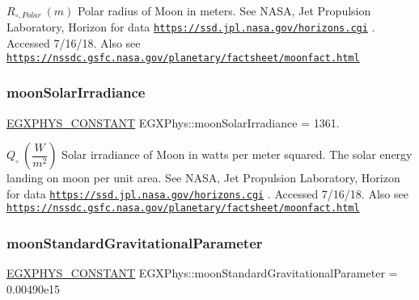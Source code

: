 $R_{\circ,Polar} \ (m)$ Polar radius of Moon in meters. See N\+A\+SA, Jet Propulsion Laboratory, Horizon for data \href{https://ssd.jpl.nasa.gov/horizons.cgi}{\tt https\+://ssd.\+jpl.\+nasa.\+gov/horizons.\+cgi} . Accessed 7/16/18. Also see \href{https://nssdc.gsfc.nasa.gov/planetary/factsheet/moonfact.html}{\tt https\+://nssdc.\+gsfc.\+nasa.\+gov/planetary/factsheet/moonfact.\+html} \mbox{\label{group___e_g_x_phys-_constants-_astrophysics-_solar_system-_moon-_bulk_ga0ff4371ee7681e0173435094465622b3}} 
\subsubsection{\texorpdfstring{moon\+Solar\+Irradiance}{moonSolarIrradiance}}
{\footnotesize\ttfamily \mbox{\hyperlink{group___e_g_x_phys-_constants-_macros_ga76980d288494ce1714c9ac68a95ba702}{E\+G\+X\+P\+H\+Y\+S\+\_\+\+C\+O\+N\+S\+T\+A\+NT}} E\+G\+X\+Phys\+::moon\+Solar\+Irradiance = 1361.}

$ Q_{\circ} \ (\dfrac{W}{m^2})$ Solar irradiance of Moon in watts per meter squared. The solar energy landing on moon per unit area. See N\+A\+SA, Jet Propulsion Laboratory, Horizon for data \href{https://ssd.jpl.nasa.gov/horizons.cgi}{\tt https\+://ssd.\+jpl.\+nasa.\+gov/horizons.\+cgi} . Accessed 7/16/18. Also see \href{https://nssdc.gsfc.nasa.gov/planetary/factsheet/moonfact.html}{\tt https\+://nssdc.\+gsfc.\+nasa.\+gov/planetary/factsheet/moonfact.\+html} \mbox{\label{group___e_g_x_phys-_constants-_astrophysics-_solar_system-_moon-_bulk_ga30d00de6ac6ae16834cb1a3d1f7e80e5}} 
\subsubsection{\texorpdfstring{moon\+Standard\+Gravitational\+Parameter}{moonStandardGravitationalParameter}}
{\footnotesize\ttfamily \mbox{\hyperlink{group___e_g_x_phys-_constants-_macros_ga76980d288494ce1714c9ac68a95ba702}{E\+G\+X\+P\+H\+Y\+S\+\_\+\+C\+O\+N\+S\+T\+A\+NT}} E\+G\+X\+Phys\+::moon\+Standard\+Gravitational\+Parameter = 0.\+00490e15}

